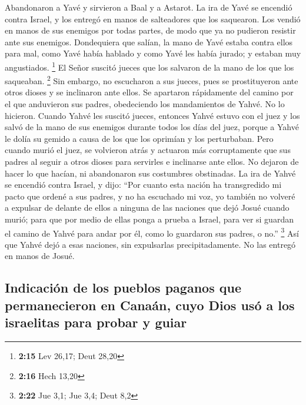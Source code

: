  Abandonaron a Yavé y sirvieron a Baal y a Astarot.
 La ira de Yavé se encendió contra Israel, y los entregó
en manos de salteadores que los saquearon. Los vendió en manos de sus
enemigos por todas partes, de modo que ya no pudieron resistir ante sus
enemigos.  Dondequiera que salían, la mano de Yavé estaba
contra ellos para mal, como Yavé había hablado y como Yavé les había
jurado; y estaban muy angustiados. \footnote{\textbf{2:15} Lev 26,17;
  Deut 28,20}  El Señor suscitó jueces que los salvaron
de la mano de los que los saqueaban. \footnote{\textbf{2:16} Hech 13,20}
 Sin embargo, no escucharon a sus jueces, pues se
prostituyeron ante otros dioses y se inclinaron ante ellos. Se apartaron
rápidamente del camino por el que anduvieron sus padres, obedeciendo los
mandamientos de Yahvé. No lo hicieron.  Cuando Yahvé les
suscitó jueces, entonces Yahvé estuvo con el juez y los salvó de la mano
de sus enemigos durante todos los días del juez, porque a Yahvé le dolía
su gemido a causa de los que los oprimían y los perturbaban.
 Pero cuando murió el juez, se volvieron atrás y actuaron
más corruptamente que sus padres al seguir a otros dioses para servirles
e inclinarse ante ellos. No dejaron de hacer lo que hacían, ni
abandonaron sus costumbres obstinadas.  La ira de Yahvé
se encendió contra Israel, y dijo: ``Por cuanto esta nación ha
transgredido mi pacto que ordené a sus padres, y no ha escuchado mi voz,
 yo también no volveré a expulsar de delante de ellos a
ninguna de las naciones que dejó Josué cuando murió; 
para que por medio de ellas ponga a prueba a Israel, para ver si guardan
el camino de Yahvé para andar por él, como lo guardaron sus padres, o
no.'' \footnote{\textbf{2:22} Jue 3,1; Jue 3,4; Deut 8,2}
 Así que Yahvé dejó a esas naciones, sin expulsarlas
precipitadamente. No las entregó en manos de Josué.

\hypertarget{indicaciuxf3n-de-los-pueblos-paganos-que-permanecieron-en-canauxe1n-cuyo-dios-usuxf3-a-los-israelitas-para-probar-y-guiar}{%
\subsection{Indicación de los pueblos paganos que permanecieron en
Canaán, cuyo Dios usó a los israelitas para probar y
guiar}\label{indicaciuxf3n-de-los-pueblos-paganos-que-permanecieron-en-canauxe1n-cuyo-dios-usuxf3-a-los-israelitas-para-probar-y-guiar}}


